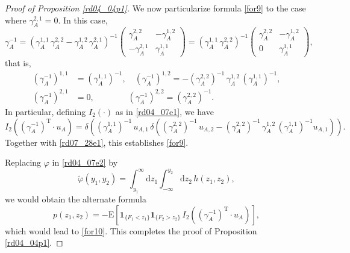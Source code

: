 \documentclass[12pt,a4paper]{article}
\newcommand{\E}{\mathrm{E}}
\newcommand{\HH}{\mathcal{H}}
\newcommand{\rT}{\text{T}}
\renewcommand{\d}{\mathrm{d}}
\newcommand{\<}{\langle}
\renewcommand{\>}{\rangle}
\begin{document}
\begin{proof}[Proof of Proposition \ref{rd04_04p1}]
 We now particularize formula \eqref{for9} to the case where $\gamma_A^{2, 1} = 0$. In this case,
 \[
     \gamma_A^{-1} = \left(\gamma_A^{1, 1}\, \gamma_A^{2, 2} - \gamma_A^{1, 2}\, \gamma_A^{2, 1}\right)^{-1} \left(\begin{array}{cc}
         \gamma_A^{2, 2} & - \gamma_A^{1, 2}  \\[7pt]
          -\gamma_A^{2, 1} &  \gamma_A^{1, 1}  \end{array}  \right) 
          = \left(\gamma_A^{1, 1}\, \gamma_A^{2, 2} \right)^{-1} \left(\begin{array}{cc}
         \gamma_A^{2, 2} & - \gamma_A^{1, 2}  \\[7pt]
          0 &  \gamma_A^{1, 1}  \end{array}  \right) ,
 \]
that is,
  \begin{align*}
     (\gamma_A^{-1})^{1,1} &= (\gamma_A^{1,1})^{-1},\quad (\gamma_A^{-1})^{1,2} = - (\gamma_A^{2,2})^{-1}\, \gamma_A^{1,2}\,(\gamma_A^{1,1})^{-1},\\
      (\gamma_A^{-1})^{2,1} &= 0,\qquad\qquad (\gamma_A^{-1})^{2,2} = (\gamma_A^{2,2})^{-1}.
  \end{align*}
 In particular, defining $I_2(\cdot)$ as in \eqref{rd04_07e1}, we have
 \[
    I_2\left((\gamma_A^{-1})^\rT\cdot u_A \right) = \delta\left( (\gamma_A^{1,1})^{-1}\, u_{A, 1}\,  \delta\left( (\gamma_A^{2,2})^{-1}\, u_{A, 2} - (\gamma_A^{2,2})^{-1}\, \gamma_A^{1,2}\,(\gamma_A^{1,1})^{-1} u_{A, 1}\right) \right).
 \] 
  Together with \eqref{rd07_28e1}, this establishes \eqref{for9}. 
  
 Replacing $\varphi$ in \eqref{rd04_07e2} by
 \[
     \tilde\varphi(y_1, y_2) =  \int_{y_1}^{\infty} \d z_1 \int_{-\infty}^{y_2} \d z_2 \, h(z_1,z_2),
 \]
 we would obtain the alternate formula
 \[
 p(z_1,z_2)= - \E \left[ \mathbf{1}_{\{F_1<z_1\}} \mathbf{1}_{\{F_2>z_2\}}\, I_2\left(\left(\gamma_A^{-1}\right)^{\rT} \cdot u_A \right) \right],
\]
which would lead to \eqref{for10}. This completes the proof of Proposition \ref{rd04_04p1}.
 \end{proof} 

  
\end{document}
